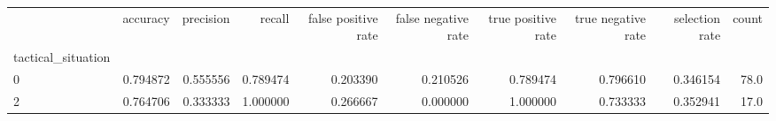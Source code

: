 \begin{tabular}{lrrrrrrrrr}
\toprule
{} &  accuracy &  precision &    recall &  false positive rate &  false negative rate &  true positive rate &  true negative rate &  selection rate &  count \\
tactical\_situation &           &            &           &                      &                      &                     &                     &                 &        \\
\midrule
0                  &  0.794872 &   0.555556 &  0.789474 &             0.203390 &             0.210526 &            0.789474 &            0.796610 &        0.346154 &   78.0 \\
2                  &  0.764706 &   0.333333 &  1.000000 &             0.266667 &             0.000000 &            1.000000 &            0.733333 &        0.352941 &   17.0 \\
\bottomrule
\end{tabular}
